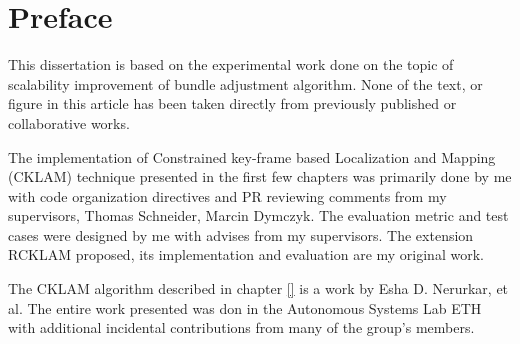 \chapter*{Preface}

This dissertation is based on the experimental work done on the topic of scalability improvement of bundle adjustment algorithm. None of the text, or figure in this article has been  taken directly from previously published or collaborative works.

The implementation of Constrained key-frame based Localization and Mapping (CKLAM) technique presented in the first few chapters was primarily done by me with code organization directives and PR reviewing comments from my supervisors, Thomas Schneider, Marcin Dymczyk. The evaluation metric and test cases were designed by me with advises from my supervisors. The extension RCKLAM proposed, its implementation and evaluation are my original work.

The CKLAM algorithm described in chapter \ref{} is a work by Esha D. Nerurkar, et al. The entire work presented was don in the Autonomous Systems Lab ETH with additional incidental contributions from many of the group’s members.